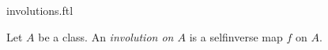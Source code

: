 \documentclass{stex}
\begin{document}
\begin{smodule}{involutions.ftl}


\begin{definition}[forthel,id=InvolDef]
  Let $A$ be a class.
  An \emph{involution on $A$} is a selfinverse map $f$ on $A$.
\end{definition}

\end{smodule}
\end{document}
